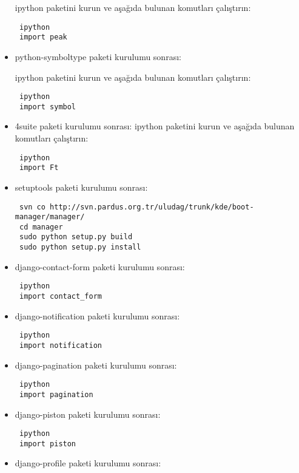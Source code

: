 \documentclass[a4paper,10pt]{article}
\begin{document}
\begin{itemize}
ipython paketini kurun ve aşağıda bulunan komutları çalıştırın:
\begin{verbatim}
 ipython
 import peak
\end{verbatim}

\item python-symboltype paketi kurulumu sonrası:

ipython paketini kurun ve aşağıda bulunan komutları çalıştırın:
\begin{verbatim}
 ipython
 import symbol
\end{verbatim}

\item 4suite paketi kurulumu sonrası:
ipython paketini kurun ve aşağıda bulunan komutları çalıştırın:
\begin{verbatim}
 ipython
 import Ft
\end{verbatim}


\item setuptools paketi kurulumu sonrası:
\begin{verbatim}
 svn co http://svn.pardus.org.tr/uludag/trunk/kde/boot-manager/manager/
 cd manager
 sudo python setup.py build 
 sudo python setup.py install
\end{verbatim}
\item django-contact-form paketi kurulumu sonrası:

\begin{verbatim}
 ipython
 import contact_form
\end{verbatim}

\item django-notification paketi kurulumu sonrası:

\begin{verbatim}
 ipython
 import notification
\end{verbatim}

\item django-pagination paketi kurulumu sonrası:

\begin{verbatim}
 ipython
 import pagination
\end{verbatim}

\item django-piston paketi kurulumu sonrası:

\begin{verbatim}
 ipython
 import piston
\end{verbatim}

\item django-profile paketi kurulumu sonrası:


\end{itemize}
\end{document}
